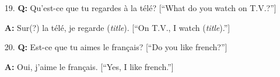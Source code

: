 \documentclass{article}
\theoremstyle{definition}
\theoremstyle{remark}
\theoremstyle{definition}
\begin{document}
\begin{enumerate}[leftmargin=*]
        \item[19.]\textbf{Q:} Qu'est-ce que tu regardes \`a la t\'el\'e? [``What do you watch on T.V.?'']\par 
            \noindent\textbf{A:} Sur(?) la t\'el\'e, je regarde (\textit{title}). [``On T.V., I watch (\textit{title}).'']\par \vspace{3mm}
            \hline
            
        \item[20.]\textbf{Q:} Est-ce que tu aimes le fran\c cais? [``Do you like french?'']\par 
            \noindent\textbf{A:} Oui, j'aime le fran\c cais. [``Yes, I like french.'']
    \end{enumerate}
\end{document}
